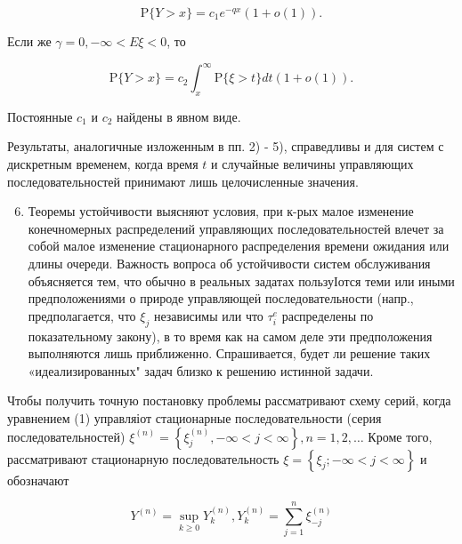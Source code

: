 \documentclass[10pt]{article}
\begin{document}
\[

\mathrm{P}\{Y>x\}=c_{1} e^{-q x}(1+o(1)) .

\]



Если же $\gamma=0,-\infty<E \xi<0$, то



\[

\mathrm{P}\{Y>x\}=c_{2} \int_{x}^{\infty} \mathrm{P}\{\xi>t\} d t(1+o(1)) .

\]



Постоянные $c_{1}$ и $c_{2}$ найдены в явном виде.



Результаты, аналогичные изложенным в пп. 2) - 5), справедливы и для систем с дискретным временем, когда время $t$ и случайные величины управляющих последовательностей принимают лишь целочисленные значения.



\begin{enumerate}

  \setcounter{enumi}{5}

  \item Теоремы устойчивости выясняют условия, при к-рых малое изменение конечномерных распределений управляющих последовательностей влечет за собой малое изменение стационарного распределения времени ожидания или длины очереди. Важность вопроса об устойчивости систем обслуживания объясняется тем, что обычно в реальных задатах пользуІотся теми или иными предположениями о природе управляющеӥ последовательности (напр., предполагается, что $\xi_{j}$ независимы или что $\tau_{i}^{e}$ распределены по показательному закону), в то время как на самом деле эти предположения выполняются лишь приближенно. Спрашивается, будет ли решение таких «идеализированных" задач близко к решению истинной задачи.

\end{enumerate}



Чтобы получить точную постановку проблемы рассматривают схему серий, когда уравнением (1) управляіот стационарные последовательности (серия последовательностей) $\xi^{(n)}=\left\{\xi_{j}^{(n)},-\infty<j<\infty\right\}, n=1,2, \ldots$ Кроме того, рассматривают стационарную последовательность $\xi=\left\{\xi_{j} ;-\infty<j<\infty\right\}$ и обозначают



\[

Y^{(n)}=\sup _{k \geqslant 0} Y_{k}^{(n)}, Y_{k}^{(n)}=\sum_{j=1}^{n} \xi_{-j}^{(n)}

\]
\end{document}
